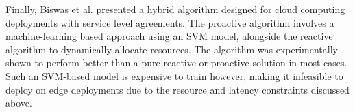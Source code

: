 Finally, Biswas et al. \cite{biswas2017hybrid} presented a hybrid algorithm designed for cloud computing deployments with service level agreements. The proactive algorithm involves a machine-learning based approach using an SVM model, alongside the reactive algorithm to dynamically allocate resources. The algorithm was experimentally shown to perform better than a pure reactive or proactive solution in most cases. Such an SVM-based model is expensive to train however, making it infeasible to deploy on edge deployments due to the resource and latency constraints discussed above.\par

